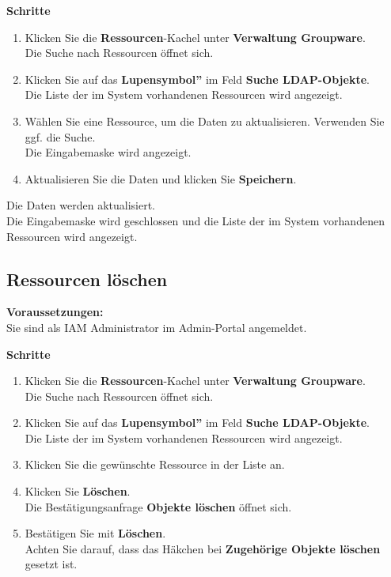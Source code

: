 \documentclass[
  letterpaper,
  DIV=11,
  numbers=noendperiod]{scrreprt}
\providecommand{\tightlist}{%
  \setlength{\itemsep}{0pt}\setlength{\parskip}{0pt}}\usepackage{longtable,booktabs,array}
\begin{document}
\textbf{Schritte}

\begin{enumerate}
\def\labelenumi{\arabic{enumi}.}
\tightlist
\item
  Klicken Sie die \textbf{Ressourcen}-Kachel unter \textbf{Verwaltung
  Groupware}.\\
  Die Suche nach Ressourcen öffnet sich.\\
\item
  Klicken Sie auf das \textbf{Lupensymbol''} im Feld \textbf{Suche
  LDAP-Objekte}.\\
  Die Liste der im System vorhandenen Ressourcen wird angezeigt.\\
\item
  Wählen Sie eine Ressource, um die Daten zu aktualisieren. Verwenden
  Sie ggf. die Suche.\\
  Die Eingabemaske wird angezeigt.\\
\item
  Aktualisieren Sie die Daten und klicken Sie \textbf{Speichern}.
\end{enumerate}

Die Daten werden aktualisiert.\\
Die Eingabemaske wird geschlossen und die Liste der im System
vorhandenen Ressourcen wird angezeigt.

\subsection{Ressourcen löschen}\label{ressourcen-luxf6schen}

\textbf{Voraussetzungen:}\\
Sie sind als IAM Administrator im Admin-Portal angemeldet.

\textbf{Schritte}

\begin{enumerate}
\def\labelenumi{\arabic{enumi}.}
\tightlist
\item
  Klicken Sie die \textbf{Ressourcen}-Kachel unter \textbf{Verwaltung
  Groupware}.\\
  Die Suche nach Ressourcen öffnet sich.\\
\item
  Klicken Sie auf das \textbf{Lupensymbol''} im Feld \textbf{Suche
  LDAP-Objekte}.\\
  Die Liste der im System vorhandenen Ressourcen wird angezeigt.\\
\item
  Klicken Sie die gewünschte Ressource in der Liste an.\\
\item
  Klicken Sie \textbf{Löschen}.\\
  Die Bestätigungsanfrage \textbf{Objekte löschen} öffnet sich.
\item
  Bestätigen Sie mit \textbf{Löschen}.\\
  Achten Sie darauf, dass das Häkchen bei \textbf{Zugehörige Objekte
  löschen} gesetzt ist.
\end{enumerate}
\end{document}
